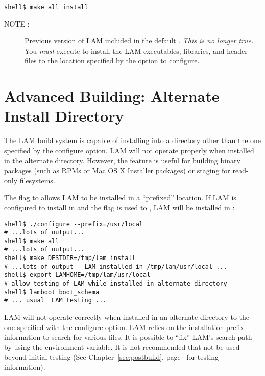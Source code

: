 \lstset{style=lam-cmdline}
\begin{lstlisting}
shell$ make all install
\end{lstlisting}

\begin{description}
\item[NOTE :] Previous version of LAM included 
   in the default .  {\em This is no
    longer true.}  You {\em must} execute 
   to install the LAM executables, libraries, and
  header files to the location specified by the 
  option to configure.
\end{description}



\section{Advanced Building: Alternate Install Directory}

The LAM build system is capable of installing into a directory other
than the one specified by the  configure option.  LAM
will not operate properly when installed in the alternate directory.
However, the feature is useful for building binary packages (such as
RPMs or Mac OS X Installer packages) or staging for read-only
filesystems.

The  flag to  allows LAM to be installed in
a ``prefixed'' location.  If LAM is configured to install in
 and the  flag is used to
, LAM will be installed in :

\lstset{style=lam-cmdline}
\begin{lstlisting}
shell$ ./configure --prefix=/usr/local
# ...lots of output...
shell$ make all
# ...lots of output...
shell$ make DESTDIR=/tmp/lam install
# ...lots of output - LAM installed in /tmp/lam/usr/local ...
shell$ export LAMHOME=/tmp/lam/usr/local
# allow testing of LAM while installed in alternate directory
shell$ lamboot boot_schema
# ... usual  LAM testing ...
\end{lstlisting}

LAM will not operate correctly when installed in an alternate
directory to the one specified with the  configure
option.  LAM relies on the installation prefix information to search
for various files.  It is possible to ``fix'' LAM's search path by
using the  environment variable.  It is not
recommended that  not be used beyond initial testing
(See Chapter~\ref{sec:postbuild}, page~\pageref{sec:postbuild} for
testing information).


